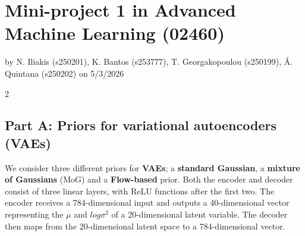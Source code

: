 \documentclass[10pt,a4paper]{article}
\begin{document}

\section*{Mini-project 1 in Advanced Machine Learning (02460)}
by N. Iliakis (s250201), K. Bantos (s253777), T. Georgakopoulou (s250199), Á. Quintana (s250202) on 5/3/2026

\begin{multicols}{2}
    \subsection*{Part A: Priors for variational autoencoders (VAEs)}
    We consider three different priors for \textbf{VAEs}; a \textbf{standard Gaussian}, a \textbf{mixture of Gaussians} (MoG) and a \textbf{Flow-based} prior. Both the encoder and decoder consist of three linear layers, with ReLU functions after the first two. The encoder receives a 784-dimensional input and outputs a 
    40-dimensional vector representing the $\mu$ and $log\sigma^2$ of a 20-dimensional latent variable. The decoder then maps from the 20-dimensional latent space to a 784-dimensional vector.


\end{multicols}
\end{document}
